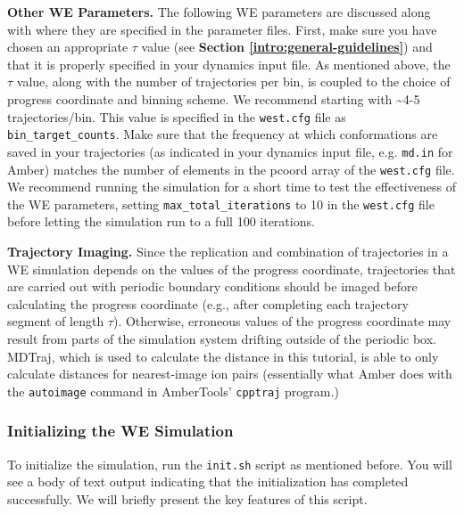 \textbf{Other WE Parameters.} The following WE parameters are discussed along with where they are specified in the parameter files. 
First, make sure you have chosen an  appropriate $\tau$ value (see \textbf{Section \ref{intro:general-guidelines}}) and that it is properly specified in your dynamics input file. 
As mentioned above, the $\tau$ value, along with the number of trajectories per bin, is coupled to the choice of progress coordinate and binning scheme. 
We recommend starting with \textasciitilde 4-5 trajectories/bin. 
This value is specified in the \verb|west.cfg| file as \verb|bin_target_counts|. 
Make sure that the frequency at which conformations are saved in your trajectories (as indicated in your dynamics input file, e.g. \verb|md.in| for Amber) matches the number of elements in the pcoord array of the \verb|west.cfg| file. 
We recommend running the simulation for a short time to test the effectiveness of the WE parameters, setting \verb|max_total_iterations| to 10 in the \verb|west.cfg| file before letting the simulation run to a full 100 iterations.  

\textbf{Trajectory Imaging.} Since the replication and combination of trajectories in a WE simulation depends on the values of the progress coordinate, trajectories that are carried out with periodic boundary conditions should be imaged before calculating the progress coordinate (e.g., after completing each trajectory segment of length $\tau$). 
Otherwise, erroneous values of the progress coordinate may result from parts of the simulation system drifting outside of the periodic box. 
MDTraj, which is used to calculate the distance in this tutorial, is able to only calculate distances for nearest-image ion pairs (essentially what Amber does with the \verb|autoimage| command in AmberTools’ \verb|cpptraj| program.)

\subsubsection{Initializing the WE Simulation}
\label{tut:basic-nacl-4}
To initialize the simulation, run the \verb|init.sh| script as mentioned before. 
You will see a body of text output indicating that the initialization has completed successfully. 
We will briefly present the key features of this script. 

